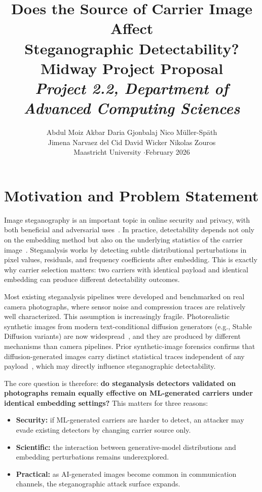 \documentclass[10pt,twocolumn,a4paper]{article}
\title{\vspace{-1.2cm}\textbf{Does the Source of Carrier Image Affect\\
Steganographic Detectability?}\\[4pt]
\large Midway Project Proposal\\[6pt]
\normalsize\textit{Project 2.2, Department of Advanced Computing Sciences}}
\author{Abdul Moiz Akbar \quad Daria Gjonbalaj \quad Nico Müller-Späth\\[2pt]
Jimena Narvaez del Cid \quad David Wicker \quad Nikolas Zouros\\[2pt]
\small Maastricht University \quad$\cdot$\quad February 2026}
\date{}
\begin{document}
\maketitle
\thispagestyle{fancy}
\vspace{-0.6cm}

\section{Motivation and Problem Statement}

Image steganography is an important topic in online security and privacy, with both beneficial and adversarial uses~\cite{petitcolas1999,cheddad2010}. In practice, detectability depends not only on the embedding method but also on the underlying statistics of the carrier image~\cite{giboulot2020csm,fridrich2001lsb}. Steganalysis works by detecting subtle distributional perturbations in pixel values, residuals, and frequency coefficients after embedding. This is exactly why carrier selection matters: two carriers with identical payload and identical embedding can produce different detectability outcomes.

Most existing steganalysis pipelines were developed and benchmarked on real camera photographs, where sensor noise and compression traces are relatively well characterized. This assumption is increasingly fragile. Photorealistic synthetic images from modern text-conditional diffusion generators (e.g., Stable Diffusion variants) are now widespread~\cite{rombach2022sd}, and they are produced by different mechanisms than camera pipelines. Prior synthetic-image forensics confirms that diffusion-generated images carry distinct statistical traces independent of any payload~\cite{corvi2023diffusion}, which may directly influence steganographic detectability.

The core question is therefore: \textbf{do steganalysis detectors validated on photographs remain equally effective on ML-generated carriers under identical embedding settings?} This matters for three reasons:
\begin{itemize}
\item \textbf{Security:} if ML-generated carriers are harder to detect, an attacker may evade existing detectors by changing carrier source only.
\item \textbf{Scientific:} the interaction between generative-model distributions and embedding perturbations remains underexplored.
\item \textbf{Practical:} as AI-generated images become common in communication channels, the steganographic attack surface expands.
\end{itemize}
\end{document}
